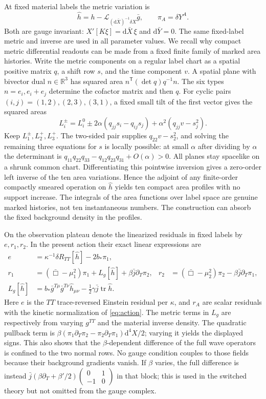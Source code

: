 \documentclass[11pt]{article}
\newcommand{\dd}{\mathrm d}
\newcommand{\tr}{\operatorname{tr}}
\newcommand{\Lie}{\mathcal L}
\begin{document}
At fixed material labels the metric variation is
\[
 \widehat h=h-\Lie_{(\dd\bar X)^{-1}\delta X}\bar g,
 \qquad \pi_A=\delta Y^A .
\]
Both are gauge invariant: $X'[K\xi]=\dd\bar X\,\xi$ and $\dd\bar Y=0$. The same fixed-label metric and inverse are used in all parameter values. We recall why compact metric differential readouts can be made from a fixed finite family of marked area histories. Write the metric components on a regular label chart as a spatial positive matrix $q$, a shift row $s$, and the time component $v$. A spatial plane with bivector dual $n\in\mathbb R^3$ has squared area $n^{\mathsf T}(\det q)q^{-1}n$. The six types $n=e_i,e_i+e_j$ determine the cofactor matrix and then $q$. For cyclic pairs $(i,j)=(1,2),(2,3),(3,1)$, a fixed small tilt of the first vector gives the squared areas
\[
 L_i^\pm=L_i^0\pm2\alpha(q_{jj}s_i-q_{ij}s_j)+\alpha^2(q_{jj}v-s_j^2).
\]
Keep $L_1^\pm,L_2^+,L_3^+$. The two-sided pair supplies $q_{22}v-s_2^2$, and solving the remaining three equations for $s$ is locally possible: at small $\alpha$ after dividing by $\alpha$ the determinant is $q_{11}q_{22}q_{33}-q_{12}q_{23}q_{31}+O(\alpha)>0$. All planes stay spacelike on a shrunk common chart. Differentiating this pointwise inversion gives a zero-order left inverse of the ten area variations. Hence the adjoint of any finite-order compactly smeared operation on $\widehat h$ yields ten compact area profiles with no support increase. The integrals of the area functions over label space are genuine marked histories, not ten instantaneous numbers. The construction can absorb the fixed background density in the profiles.

On the observation plateau denote the linearized residuals in fixed labels by $e,r_1,r_2$. In the present action their exact linear expressions are
\begin{align}
 e&=\kappa^{-1}\delta R_{TT}[\widehat h]-2b_*\pi_1,\nonumber\\
 r_1&=(\bar\Box-\mu_1^2)\pi_1+L_g[\widehat h]+\beta\bar j\partial_T\pi_2,
 &r_2&=(\bar\Box-\mu_2^2)\pi_2-\beta\bar j\partial_T\pi_1,                \label{eq:linearized}\\
 L_g[\widehat h]&=b_*\bar g^{T\mu}\bar g^{T\nu}\widehat h_{\mu\nu}
                 -\tfrac12\gamma\bar j\tr\widehat h .\nonumber
\end{align}
Here $e$ is the $TT$ trace-reversed Einstein residual per $\kappa$, and $r_A$ are scalar residuals with the kinetic normalization of \eqref{eq:action}. The metric terms in $L_g$ are respectively from varying $g^{TT}$ and the material inverse density. The quadratic pullback term is $\beta(\pi_1\partial_T\pi_2-\pi_2\partial_T\pi_1)\dd^4X/2$; varying it yields the displayed signs. This also shows that the $\beta$-dependent difference of the full wave operators is confined to the two normal rows. No gauge condition couples to those fields because their background gradients vanish. If $\beta$ varies, the full difference is instead $\bar j(\beta\partial_T+\beta'/2)\left(\begin{smallmatrix}0&1\\-1&0\end{smallmatrix}\right)$ in that block; this is used in the switched theory but not omitted from the gauge complex.
\end{document}
